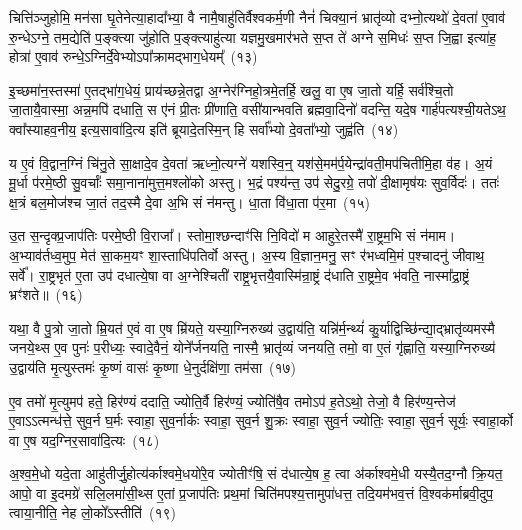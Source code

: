 {\anuvakamend[{उपै॒तान्धारा॑यै॒ षट्च॑त्वारिꣳशच्च}]}

चित्ति॑ञ्जुहोमि॒ मन॑सा घृ॒तेनेत्या॒हादा᳚भ्या॒ वै नामै॒षाहु॑तिर्वैश्वकर्म॒णी नैनं॑ चिक्या॒नं भ्रातृ॑व्यो दभ्नो॒त्यथो॑ दे॒वता॑ ए॒वाव॑ रु॒न्धे\-ऽग्ने॒ तम॒द्येति॑ प॒ङ्क्त्या जु॑होति प॒ङ्क्त्याहु॑त्या यज्ञमु॒खमार॑भते स॒प्त ते॑ अग्ने स॒मिधः॑ स॒प्त जि॒ह्वा इत्या॑ह॒ होत्रा॑ ए॒वाव॑ रुन्धे॒\-ऽग्निर्दे॒वेभ्यो\-ऽपा᳚क्रामद्भाग॒धेयम्᳚~(१३)\ip

इ॒च्छमा॑न॒स्तस्मा॑ ए॒तद्भा॑ग॒धेयं॒ प्राय॑च्छन्ने॒तद्वा अ॒ग्नेर॑ग्निहो॒त्रमे॒तर्\mbox{}हि॒ खलु॒ वा ए॒ष जा॒तो यर्\mbox{}हि॒ सर्व॑श्चि॒तो जा॒तायै॒वास्मा॒ अन्न॒मपि॑ दधाति॒ स ए॑नं प्री॒तः प्री॑णाति॒ वसी॑यान्भवति ब्रह्मवा॒दिनो॑ वदन्ति॒ यदे॒ष गार्\mbox{}ह॑पत्यश्ची॒यते\-ऽथ॒ क्वा᳚स्याहव॒नीय॒ इत्य॒सावा॑दि॒त्य इति॑ ब्रूयादे॒तस्मि॒न् हि सर्वा᳚भ्यो दे॒वता᳚भ्यो॒ जुह्व॑ति~(१४)\ip

य ए॒वं वि॒द्वान॒ग्निं चि॑नु॒ते सा॒क्षादे॒व दे॒वता॑ ऋध्नो॒त्यग्ने॑ यशस्वि॒न्॒ यश॑से॒मम॑र्प॒येन्द्रा॑वती॒मप॑चितीमि॒हा व॑ह। अ॒यं मू॒र्धा प॑रमे॒ष्ठी सु॒वर्चाः᳚ समा॒नाना॑मुत्त॒मश्लो॑को अस्तु। भ॒द्रं पश्य॑न्त॒ उप॑ सेदु॒रग्रे॒ तपो॑ दी॒क्षामृष॑यः सुव॒र्विदः॑। ततः॑ क्ष॒त्रं बल॒मोज॑श्च जा॒तं तद॒स्मै दे॒वा अ॒भि सं न॑मन्तु। धा॒ता वि॑धा॒ता प॑र॒मा~(१५)\ip

उ॒त स॒न्दृक्प्र॒जा\-प॑तिः परमे॒ष्ठी वि॒राजा᳚। स्तोमा॒श्छन्दाꣳ॑सि नि॒विदो॑ म आहुरे॒तस्मै॑ रा॒ष्ट्रम॒भि सं न॑माम। अ॒भ्याव॑र्तध्व॒मुप॒ मेत॑ सा॒कम॒यꣳ शा॒स्ताधि॑\-पतिर्वो अस्तु। अ॒स्य वि॒ज्ञान॒मनु॒ सꣳ र॑भध्वमि॒मं प॒श्चादनु॑ जीवाथ॒ सर्वे᳚। रा॒ष्ट्रभृत॑ ए॒ता उप॑ दधात्ये॒षा वा अ॒ग्नेश्चिती॑ राष्ट्र॒भृत्तयै॒वास्मि॑न्रा॒ष्ट्रं द॑धाति रा॒ष्ट्रमे॒व भ॑वति॒ नास्मा᳚द्रा॒ष्ट्रं भ्रꣳ॑शते॥~(१६)\ip

{\anuvakamend[{भा॒ग॒धेय॒ञ्जुह्व॑ति पर॒मा रा॒ष्ट्रं द॑धाति स॒प्त च॑}]}

यथा॒ वै पु॒त्रो जा॒तो म्रि॒यत॑ ए॒वं वा ए॒ष म्रि॑यते॒ यस्या॒ग्निरुख्य॑ उ॒द्वाय॑ति॒ यन्नि॑र्म॒न्थ्यं॑ कु॒र्याद्विच्छि॑न्द्या॒द्भ्रातृ॑व्यमस्मै जनये॒थ्स ए॒व पुनः॑ प॒रीध्यः॒ स्वादे॒वैनं॒ योने᳚र्जनयति॒ नास्मै॒ भ्रातृ॑व्यं जनयति॒ तमो॒ वा ए॒तं गृ॑ह्णाति॒ यस्या॒ग्निरुख्य॑ उ॒द्वाय॑ति मृ॒त्युस्तमः॑ कृ॒ष्णं वासः॑ कृ॒ष्णा धे॒नुर्दक्षि॑णा॒ तम॑सा~(१७)\ip

ए॒व तमो॑ मृ॒त्युमप॑ हते॒ हिर॑ण्यं ददाति॒ ज्योति॒र्वै हिर॑ण्यं॒ ज्योति॑षै॒व तमो\-ऽप॑ ह॒ते\-ऽथो॒ तेजो॒ वै हिर॑ण्य॒न्तेज॑ ए॒वा\-ऽऽ\-त्मन्ध॑त्ते॒ सुव॒र्न घ॒र्मः स्वाहा॒ सुव॒र्नार्कः स्वाहा॒ सुव॒र्न शु॒क्रः स्वाहा॒ सुव॒र्न ज्योतिः॒ स्वाहा॒ सुव॒र्न सूर्यः॒ स्वाहा॒र्को वा ए॒ष यद॒ग्निर॒सावा॑दि॒त्यः~(१८)\ip

अ॒श्व॒मे॒धो यदे॒ता आहु॑तीर्जु॒होत्य॑र्काश्वमे॒धयो॑रे॒व ज्योतीꣳ॑षि॒ सं द॑धात्ये॒ष ह॒ त्वा अ॑र्काश्वमे॒धी यस्यै॒तद॒ग्नौ क्रि॒यत॒ आपो॒ वा इ॒दमग्रे॑ सलि॒लमा॑सी॒थ्स ए॒तां प्र॒जा\-प॑तिः प्रथ॒मां चिति॑मपश्य॒त्तामुपा॑धत्त॒ तदि॒यम॑भव॒त्तं वि॒श्वक॑र्माब्रवी॒दुप॒ त्वाया॒नीति॒ नेह लो॒को᳚\-ऽस्तीति॑~(१९)\ip

